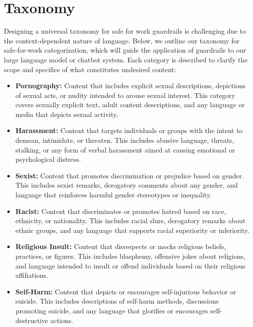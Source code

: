 \documentclass[preprint]{article}
\begin{document}
\section{Taxonomy}

Designing a universal taxonomy for safe for work guardrails is challenging due to the context-dependent nature of language. Below, we outline our taxonomy for safe-for-work categorization, which will guide the application of guardrails to our large language model or chatbot system. Each category is described to clarify the scope and specifics of what constitutes undesired content:

\begin{itemize}
    \item \textbf{Pornography:} Content that includes explicit sexual descriptions, depictions of sexual acts, or nudity intended to arouse sexual interest. This category covers sexually explicit text, adult content descriptions, and any language or media that depicts sexual activity.

    \item \textbf{Harassment:} Content that targets individuals or groups with the intent to demean, intimidate, or threaten. This includes abusive language, threats, stalking, or any form of verbal harassment aimed at causing emotional or psychological distress.

    \item \textbf{Sexist:} Content that promotes discrimination or prejudice based on gender. This includes sexist remarks, derogatory comments about any gender, and language that reinforces harmful gender stereotypes or inequality.

    \item \textbf{Racist:} Content that discriminates or promotes hatred based on race, ethnicity, or nationality. This includes racial slurs, derogatory remarks about ethnic groups, and any language that supports racial superiority or inferiority.

    \item \textbf{Religious Insult:} Content that disrespects or mocks religious beliefs, practices, or figures. This includes blasphemy, offensive jokes about religions, and language intended to insult or offend individuals based on their religious affiliations.

    \item \textbf{Self-Harm:} Content that depicts or encourages self-injurious behavior or suicide. This includes descriptions of self-harm methods, discussions promoting suicide, and any language that glorifies or encourages self-destructive actions.


\end{itemize}
\end{document}
